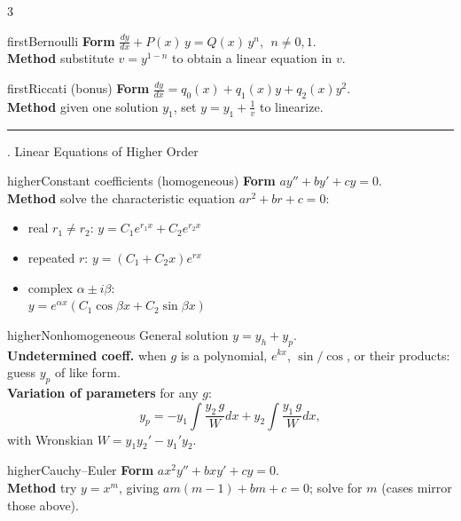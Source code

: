 \documentclass[10pt]{article}
\newcommand{\lab}[1]{\textcolor{ink}{\sffamily\footnotesize\textbf{#1}}\;}
\newcommand{\dydx}{\frac{dy}{dx}}
\newcommand{\sect}[2]{%
  \begin{tcolorbox}[blanker, breakable, before skip=2pt, after skip=2pt]
    \begingroup\sffamily\bfseries\normalsize\color{#1}%
    {\color{#1}\rule[-1pt]{3pt}{12pt}}\;#2\endgroup
    \par\vspace{1pt}{\color{#1}\hrule height 1pt}
\end{tcolorbox}}
\begin{document}
\begin{multicols}{3}
  \begin{card}{first}{Bernoulli}
    \lab{Form} \(\dydx+P(x)\,y=Q(x)\,y^{n}\), \(\;n\neq0,1\).\\
    \lab{Method} substitute \(v=y^{1-n}\) to obtain a linear equation in \(v\).
  \end{card}

  \begin{card}{first}{Riccati \small(bonus)}
    \lab{Form} \(\dydx=q_{0}(x)+q_{1}(x)y+q_{2}(x)y^{2}\).\\
    \lab{Method} given one solution \(y_{1}\), set \(y=y_{1}+\frac{1}{v}\) to linearize.
  \end{card}

  \columnbreak
  \sect{higher}{3.\; Linear Equations of Higher Order}

  \begin{card}{higher}{Constant coefficients (homogeneous)}
    \lab{Form} \(ay''+by'+cy=0\).\\
    \lab{Method} solve the characteristic equation \(ar^{2}+br+c=0\):
    \begin{itemize}
      \item real \(r_{1}\neq r_{2}\):\; \(y=C_{1}e^{r_{1}x}+C_{2}e^{r_{2}x}\)
      \item repeated \(r\):\; \(y=(C_{1}+C_{2}x)e^{rx}\)
      \item complex \(\alpha\pm i\beta\):\\ \(y=e^{\alpha x}(C_{1}\cos\beta x+C_{2}\sin\beta x)\)
    \end{itemize}
  \end{card}

  \begin{card}{higher}{Nonhomogeneous}
    General solution \(y=y_{h}+y_{p}\).\\[2pt]
    \lab{Undetermined coeff.} when \(g\) is a polynomial, \(e^{kx}\), \(\sin/\cos\), or their products: guess \(y_{p}\) of like form.\\[2pt]
    \lab{Variation of parameters} for any \(g\):
    \[ y_{p}=-y_{1}\!\int\!\frac{y_{2}\,g}{W}dx+y_{2}\!\int\!\frac{y_{1}\,g}{W}dx, \]
    with Wronskian \(W=y_{1}y_{2}'-y_{1}'y_{2}\).
  \end{card}

  \begin{card}{higher}{Cauchy--Euler}
    \lab{Form} \(ax^{2}y''+bxy'+cy=0\).\\
    \lab{Method} try \(y=x^{m}\), giving \(am(m-1)+bm+c=0\); solve for \(m\) (cases mirror those above).
  \end{card}


\end{multicols}
\end{document}
